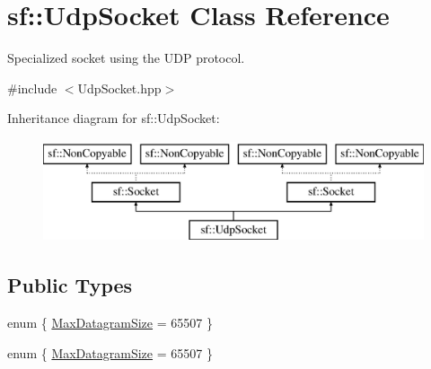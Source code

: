 \hypertarget{classsf_1_1_udp_socket}{\section{sf\-:\-:Udp\-Socket Class Reference}
\label{classsf_1_1_udp_socket}
}


Specialized socket using the U\-D\-P protocol.  




{\ttfamily \#include $<$Udp\-Socket.\-hpp$>$}

Inheritance diagram for sf\-:\-:Udp\-Socket\-:\begin{figure}[H]
\begin{center}
\leavevmode
\includegraphics[height=3.000000cm]{classsf_1_1_udp_socket}
\end{center}
\end{figure}
\subsection*{Public Types}
\begin{DoxyCompactItemize}
\item 
enum \{ \hyperlink{classsf_1_1_udp_socket_a589aae95d5f58edde6342af1d1bb940ca85c89bc58b797626b7211c06eb78e6b5}{Max\-Datagram\-Size} = 65507
 \}
\item 
enum \{ \hyperlink{classsf_1_1_udp_socket_a589aae95d5f58edde6342af1d1bb940ca85c89bc58b797626b7211c06eb78e6b5}{Max\-Datagram\-Size} = 65507
 \}
\end{DoxyCompactItemize}
